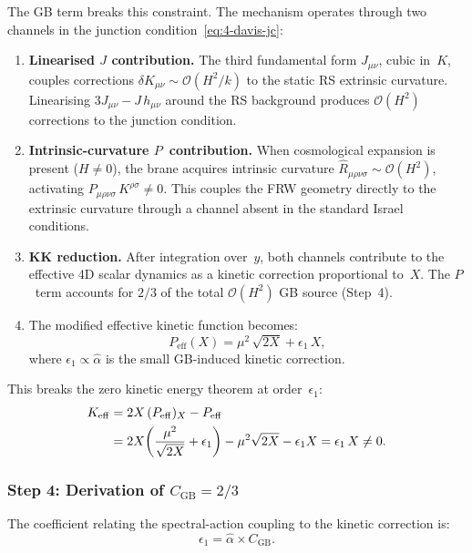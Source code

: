 The GB term breaks this constraint. The mechanism operates through two channels in the junction condition~\eqref{eq:4-davis-jc}:
\begin{enumerate}
  \item \textbf{Linearised $J$ contribution.} The third fundamental form $J_{\mu\nu}$, cubic in~$K$, couples corrections $\delta K_{\mu\nu} \sim \mathcal{O}(H^2/k)$ to the static RS extrinsic curvature. Linearising $3J_{\mu\nu} - J\, h_{\mu\nu}$ around the RS background produces $\mathcal{O}(H^2)$ corrections to the junction condition.
  \item \textbf{Intrinsic-curvature $P$~contribution.} When cosmological expansion is present ($H \neq 0$), the brane acquires intrinsic curvature $\hat{R}_{\mu\rho\nu\sigma} \sim \mathcal{O}(H^2)$, activating $P_{\mu\rho\nu\sigma}\, K^{\rho\sigma} \neq 0$. This couples the FRW geometry directly to the extrinsic curvature through a channel absent in the standard Israel conditions.
  \item \textbf{KK reduction.} After integration over~$y$, both channels contribute to the effective 4D scalar dynamics as a kinetic correction proportional to~$X$. The $P$~term accounts for $2/3$ of the total $\mathcal{O}(H^2)$ GB source (Step~4).
  \item The modified effective kinetic function becomes:
  \begin{equation}
    P_{\mathrm{eff}}(X) = \mu^2\, \sqrt{2X} + \epsilon_1\, X,
    \label{eq:4-peff}
  \end{equation}
  where $\epsilon_1 \propto \hat{\alpha}$ is the small GB-induced kinetic correction.
\end{enumerate}

This breaks the zero kinetic energy theorem at order~$\epsilon_1$:
\begin{align}
  K_{\mathrm{eff}} &= 2X\, (P_{\mathrm{eff}})_X - P_{\mathrm{eff}}
  \notag\\
  &= 2X\!\left(\frac{\mu^2}{\sqrt{2X}} + \epsilon_1\right) - \mu^2\sqrt{2X} - \epsilon_1 X
  = \epsilon_1\, X \neq 0.
  \label{eq:4-keff-breaking}
\end{align}


\subsubsection{Step 4: Derivation of $C_{\mathrm{GB}} = 2/3$}

The coefficient relating the spectral-action coupling to the kinetic correction is:
\begin{equation}
  \epsilon_1 = \hat{\alpha} \times C_{\mathrm{GB}}.
  \label{eq:4-eps1-def}
\end{equation}

